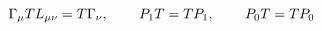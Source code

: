 \begin{equation}
\Gamma _\mu TL_{\mu \nu }=T\Gamma _\nu , \hspace{0.3in}P_1 T=TP_1
, \hspace{0.3in}P_0 T=TP_0 \label{43}
\end{equation}

